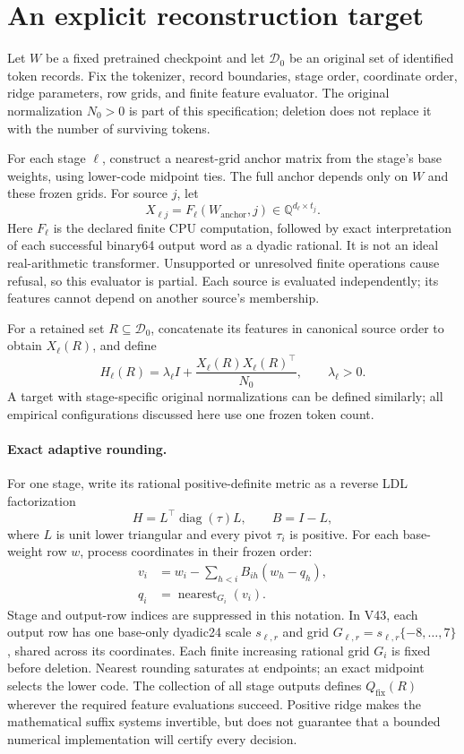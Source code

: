 \documentclass[10pt,twocolumn,letterpaper]{article}
\newcommand{\Q}{\mathbb{Q}}
\newcommand{\calD}{\mathcal{D}}
\newcommand{\Qfix}{Q_{\mathrm{fix}}}
\begin{document}
\section{An explicit reconstruction target}
\label{sec:target}
Let $W$ be a fixed pretrained checkpoint and let $\calD_0$ be an original set of
identified token records. Fix the tokenizer, record boundaries, stage order,
coordinate order, ridge parameters, row grids, and finite feature evaluator.
The original normalization $N_0>0$ is part of this specification; deletion does
not replace it with the number of surviving tokens.

For each stage $\ell$, construct a nearest-grid anchor matrix from the stage's
base weights, using lower-code midpoint ties. The full anchor depends only on
$W$ and these frozen grids. For source $j$, let
\[
 X_{\ell j}=F_\ell(W_{\mathrm{anchor}},j)
       \in\Q^{d_\ell\times t_j}.
\]
Here $F_\ell$ is the declared finite CPU computation, followed by exact
interpretation of each successful binary64 output word as a dyadic rational.
It is not an ideal real-arithmetic transformer. Unsupported or unresolved finite
operations cause refusal, so this evaluator is partial. Each source is evaluated
independently; its features cannot depend on another source's membership.

For a retained set $R\subseteq\calD_0$, concatenate its features in canonical
source order to obtain $X_\ell(R)$, and define
\begin{equation}
 H_\ell(R)=\lambda_\ell I+
   \frac{X_\ell(R)X_\ell(R)^\top}{N_0},
 \qquad \lambda_\ell>0.
 \label{eq:metric}
\end{equation}
A target with stage-specific original normalizations can be defined similarly;
all empirical configurations discussed here use one frozen token count.

\paragraph{Exact adaptive rounding.}
For one stage, write its rational positive-definite metric as a reverse LDL
factorization
\[
 H=L^\top\operatorname{diag}(\tau)L,
 \qquad B=I-L,
\]
where $L$ is unit lower triangular and every pivot $\tau_i$ is positive. For each
base-weight row $w$, process coordinates in their frozen order:
\begin{align}
 v_i&=w_i-\sum_{h<i} B_{ih}(w_h-q_h),\label{eq:recurrence}\\
 q_i&=\operatorname{nearest}_{G_i}(v_i).
 \label{eq:rounding}
\end{align}
Stage and output-row indices are suppressed in this notation. In V43, each
output row has one base-only dyadic24 scale $s_{\ell,r}$ and grid
$G_{\ell,r}=s_{\ell,r}\{-8,\ldots,7\}$, shared across its coordinates.
Each finite increasing rational grid $G_i$ is fixed before deletion. Nearest
rounding saturates at endpoints; an exact midpoint selects the lower code. The
collection of all stage outputs defines $\Qfix(R)$ wherever the required feature
evaluations succeed. Positive ridge makes the mathematical suffix systems
invertible, but does not guarantee that a bounded numerical implementation will
certify every decision.
\end{document}
